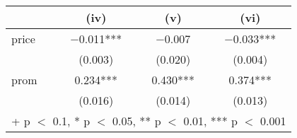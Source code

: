 \begin{table}
\centering
\begin{tabular}[t]{lccc}
\toprule
  & (iv) & (v) & (vi)\\
\midrule
price & \num{-0.011}*** & \num{-0.007} & \num{-0.033}***\\
 & (\num{0.003}) & (\num{0.020}) & (\num{0.004})\\
prom & \num{0.234}*** & \num{0.430}*** & \num{0.374}***\\
 & (\num{0.016}) & (\num{0.014}) & (\num{0.013})\\
\bottomrule
\multicolumn{4}{l}{\rule{0pt}{1em}+ p $<$ 0.1, * p $<$ 0.05, ** p $<$ 0.01, *** p $<$ 0.001}\\
\end{tabular}
\end{table}
